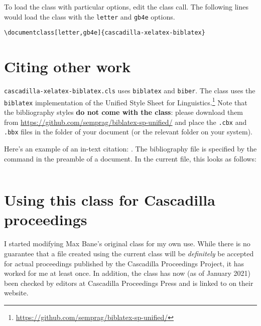 \documentclass[usegb4e]{cascadilla-xelatex-biblatex}
\begin{document}
To load the class with particular options, edit the class call. The following
lines would load the class with the \texttt{letter} and \texttt{gb4e} options.

\begin{verbatim}
\documentclass[letter,gb4e]{cascadilla-xelatex-biblatex}
\end{verbatim}

\section{Citing other work}\label{sec:bib}

\texttt{cascadilla-xelatex-biblatex.cls} uses \texttt{biblatex} and
\texttt{biber}. The class uses the \texttt{biblatex} implementation of the
Unified Style Sheet for
Linguistics.\footnote{\url{https://github.com/semprag/biblatex-sp-unified/}}
Note that the bibliography styles \textbf{do not come with the class}: please
download them from \url{https://github.com/semprag/biblatex-sp-unified/} and
place the \texttt{.cbx} and \texttt{.bbx} files in the folder of your document
(or the relevant folder on your system).

Here's an example of an in-text citation: \textcite{EKiss2008}. The
bibliography file is specified by the \verb++ command in the
preamble of a document. In the current file, this looks as follows:

\begin{verbatim}

\end{verbatim}

\section{Using this class for Cascadilla proceedings}

I started modifying Max Bane's original class for my own use. While there is no
guarantee that a file created using the current class will be \emph{definitely}
be accepted for actual proceedings published by the Cascadilla Proceedings
Project, it has worked for me at least once. In addition, the class has now (as
of January 2021) been checked by editors at Cascadilla Proceedings Press and is
linked to on their website.

\printbibliography
\end{document}
